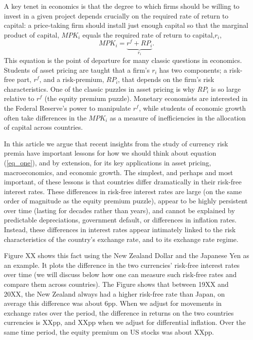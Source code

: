 \documentclass[12pt,letter]{article}
\theoremstyle{break} \theorembodyfont{\normalfont\itshape}
\theoremstyle{break}
\theoremstyle{break} \theorembodyfont{\normalfont\itshape}
\theoremstyle{break} \theorembodyfont{\normalfont\itshape}
\begin{document}
A key tenet in economics is that the degree to which firms should be willing to invest in a given project depends crucially on the required rate of return to capital: a price-taking firm should install just enough capital so that the marginal product of capital, $MPK_i$ equals the required rate of return to capital,$r_i$, \begin{equation}MPK_i=\underbrace{r^f+RP_i}_{ r_i}.\label{eq_one}\end{equation} 
This equation is the point of departure for many classic questions in economics. Students of asset pricing are taught that a firm's $r_i$ has two components; a risk-free part, $r^f$, and a risk-premium, $RP_i$, that depends on the firm's risk characteristics. One of the classic puzzles in asset pricing is why $RP_i$ is so large relative to $r^f$ (the equity premium puzzle). Monetary economists are interested in the Federal Reserve's power to manipulate $r^f$, while students of economic growth often take differences in the $MPK_i$ as a measure of inefficiencies in the allocation of capital across countries.

In this article we argue that recent insights from the study of currency risk premia have important lessons for how we should think about equation (\ref{eq_one}), and by extension, for its key applications in asset pricing, macroeconomics, and economic growth. The simplest, and perhaps and most important, of these lessons is that countries differ dramatically in their risk-free interest rates. These differences in risk-free interest rates are large (on the same order of magnitude as the equity premium puzzle), appear to be highly persistent over time (lasting for decades rather than years), and cannot be explained by predictable depreciations, government default, or differences in inflation rates. Instead, these differences in interest rates appear intimately linked to the risk characteristics of the country's exchange rate, and to its exchange rate regime.   

Figure XX shows this fact using the New Zealand Dollar and the Japanese Yen as an example. It plots the difference in the two currencies' risk-free interest rates over time (we will discuss below how one can measure such risk-free rates and compare them across countries). The Figure shows that between 19XX and 20XX, the New Zealand always had a higher risk-free rate than Japan, on average this difference was about 6pp. When we adjust for movements in exchange rates over the period, the difference in returns on the two countries currencies is XXpp, and XXpp when we adjust for differential inflation. Over the same time period, the equity premium on US stocks was about XXpp.
\end{document}
